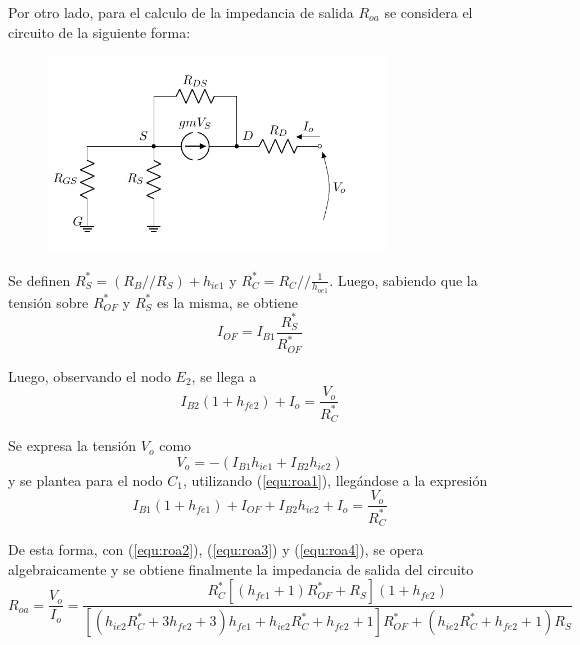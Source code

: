 Por otro lado, para el calculo de la impedancia de salida $R_{oa}$ se considera el circuito de la siguiente forma:
\begin{figure}[H]
\centering
	\includegraphics[width=0.8\textwidth, page=6]{Imagenes/ModeloIncremental.pdf}
\end{figure}
Se definen $R_{S}^* = \left( R_B // R_S \right) + h_{ie1}$ y $R_C^* = R_C // \frac{1}{h_{oe1}}$. Luego, sabiendo que la tensión sobre $R_{OF}^*$ y $R_{S}^*$ es la misma, se obtiene
\begin{equation}
	I_{OF} = I_{B1} \frac{R_{S}^*}{R_{OF}^*}
	\label{equ:roa1}
\end{equation}

Luego, observando el nodo $E_2$, se llega a
\begin{equation}
	I_{B2} \left( 1 + h_{fe2} \right) + I_o = \frac{V_o}{R_{C}^*}
	\label{equ:roa2}
\end{equation}

Se expresa la tensión $V_o$ como
\begin{equation}
	V_o = - \left( I_{B1} h_{ie1} + I_{B2} h_{ie2} \right)
	\label{equ:roa3}
\end{equation}
y se plantea para el nodo $C_1$, utilizando (\ref{equ:roa1}), llegándose a la expresión
\begin{equation}
	I_{B1} \left( 1 + h_{fe1} \right) + I_{OF} + I_{B2} h_{ie2} + I_o = \frac{V_o}{R_{C}^*}
	\label{equ:roa4}
\end{equation}

De esta forma, con (\ref{equ:roa2}), (\ref{equ:roa3}) y (\ref{equ:roa4}), se opera algebraicamente y se obtiene finalmente la impedancia de salida del circuito
\begin{equation}
R_{oa} = \frac{V_o}{I_o} = 
\frac {R_{C}^* \left[ \left( h_{fe1} + 1 \right) R_{OF}^* + R_{S} \right] \left( 1 + h_{fe2} \right) }{ \left[ \left( h_{ie2} R_{C}^* + 3 h_{fe2} + 3 \right) h_{fe1} + h_{ie2} R_{C}^* + h_{fe2} + 1 \right] R_{OF}^* + \left( h_{ie2} R_{C}^* + h_{fe2} + 1 \right) R_{S} }
\end{equation}

